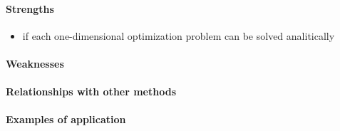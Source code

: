 \paragraph{Strengths}
\begin{itemize}
    \item if each one-dimensional optimization problem can be solved analitically
\end{itemize}

\paragraph{Weaknesses}
\paragraph{Relationships with other methods}
\paragraph{Examples of application}

